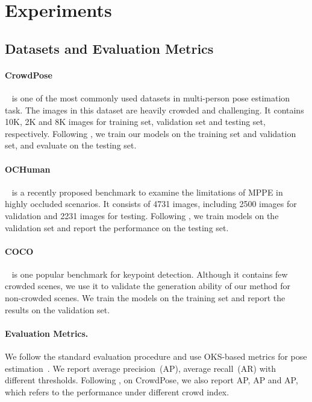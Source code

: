 \documentclass{article}
\begin{document}
\section{Experiments}





\subsection{Datasets and Evaluation Metrics}

\paragraph{CrowdPose}~\cite{li2019crowdpose} is one of the most commonly used datasets in multi-person pose estimation task. The images in this dataset are heavily crowded and challenging. It contains 10K, 2K and 8K images for training set, validation set and testing set, respectively. Following \cite{cheng2020higherhrnet,geng2021bottom}, we train our models on the training set and validation set, and evaluate on the testing set.

\paragraph{OCHuman}~\cite{zhang2019pose2seg} is a recently proposed benchmark to examine the limitations of MPPE in highly occluded scenarios. It consists of 4731 images, including 2500 images for validation and 2231 images for testing. Following \cite{qiu2020peeking}, we train models on the validation set and report the performance on the testing set.


\paragraph{COCO}~\cite{lin2014microsoft} is one popular benchmark for keypoint detection. Although it contains few crowded scenes, we use it to validate the generation ability of our method for non-crowded scenes. We train the models on the training set and report the results on the validation set.



\paragraph{Evaluation Metrics.} We follow the standard evaluation procedure and use OKS-based metrics for pose estimation~\cite{lin2014microsoft}. We report average precision~(AP), average recall~(AR) with different thresholds. Following \cite{li2019crowdpose}, on CrowdPose, we also report AP, AP and AP, which refers to the performance under different crowd index.
\end{document}
